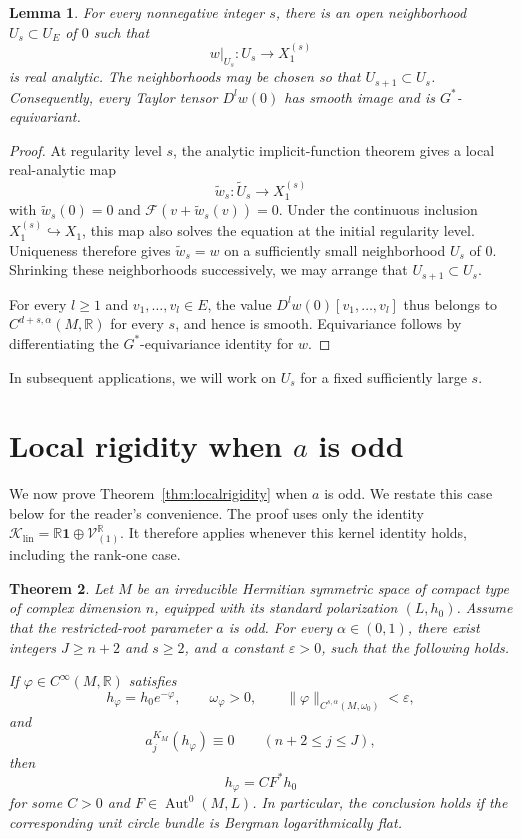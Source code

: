 \documentclass[11pt,reqno]{amsart}
\newtheorem{theorem}{Theorem}[section]
\newtheorem{lemma}[theorem]{Lemma}
\theoremstyle{corollary}
\theoremstyle{conjecture}
\theoremstyle{assumption}
\theoremstyle{proposition}
\theoremstyle{remark}
\numberwithin{equation}{section}
\begin{document}
\begin{lemma}\label{lem:compatible-graph-germs}
For every nonnegative integer $s$, there is an open neighborhood $U_s\subset U_E$ of $0$ such that
\[
w|_{U_s}\colon U_s\longrightarrow X_1^{(s)}
\]
is real analytic. The neighborhoods may be chosen so that $U_{s+1}\subset U_s$. Consequently, every Taylor tensor $D^l w(0)$ has smooth image and is $G^*$-equivariant.
\end{lemma}

\begin{proof}
At regularity level $s$, the analytic implicit-function theorem gives a local real-analytic map
\[
\widetilde w_s\colon\widetilde U_s\longrightarrow X_1^{(s)}
\]
with $\widetilde w_s(0)=0$ and $\mathcal F(v+\widetilde w_s(v))=0$. Under the continuous inclusion $X_1^{(s)}\hookrightarrow X_1$, this map also solves the equation at the initial regularity level. Uniqueness therefore gives $\widetilde w_s=w$ on a sufficiently small neighborhood $U_s$ of $0$. Shrinking these neighborhoods successively, we may arrange that $U_{s+1}\subset U_s$.

For every $l\geq1$ and $v_1,\ldots,v_l\in E$, the value $D^l w(0)[v_1,\ldots,v_l]$ thus belongs to $C^{d+s,\alpha}(M,\mathbb R)$ for every $s$, and hence is smooth. Equivariance follows by differentiating the $G^*$-equivariance identity for $w$.
\end{proof}

In subsequent applications, we will work on $U_s$ for a fixed sufficiently large $s$.

\section{Local rigidity when $a$ is odd}
\label{sec:odd-a-rigidity}

We now prove Theorem~\ref{thm:localrigidity} when $a$ is odd. We restate this case below for the reader's convenience. The proof uses only the identity $\mathcal K_{\operatorname{lin}}=\mathbb R\mathbf1\oplus\mathcal V_{(1)}^{\mathbb R}$. It therefore applies whenever this kernel identity holds, including the rank-one case.
 
\begin{theorem}\label{thm:odd-a-rigidity}
Let $M$ be an irreducible Hermitian symmetric space of compact type of complex dimension $n$, equipped with its standard polarization $(L,h_0)$. Assume that the restricted-root parameter $a$ is odd. For every $\alpha\in(0,1)$, there exist integers $J\geq n+2$ and $s\geq 2$, and a constant $\varepsilon>0$, such that the following holds.

If $\varphi\in C^\infty(M,\mathbb R)$ satisfies
\[
h_\varphi=h_0e^{-\varphi},\qquad\omega_\varphi>0,\qquad\|\varphi\|_{C^{s,\alpha}(M,\omega_0)}<\varepsilon,
\]
and
\[
a^{K_M}_j(h_\varphi)\equiv0\qquad(n+2\leq j\leq J),
\]
then
\[
h_\varphi=CF^*h_0
\]
for some $C>0$ and $F\in\operatorname{Aut}^0(M,L)$. In particular, the conclusion holds if the corresponding unit circle bundle is Bergman logarithmically flat.
\end{theorem}
\end{document}
